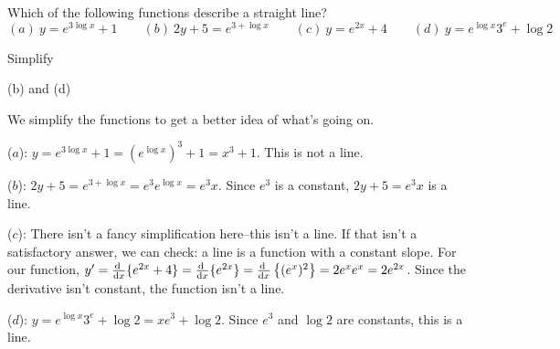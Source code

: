 \begin{Mquestion}
Which of the following functions describe a straight line?
\[(a) ~y=e^{3\log x}+1 \qquad (b) ~2y+5=e^{3+\log x} \qquad (c)~y=e^{2x}+4\qquad (d)~y=e^{\log x}3^e+\log 2\]
\end{Mquestion}
\begin{hint}
Simplify
\end{hint}
\begin{answer}
(b) and (d)
\end{answer}
\begin{solution}
We simplify the functions to get a better idea of what's going on.

($a$): $y=e^{3\log x}+1=\left(e^{\log x}\right)^3+1=x^3+1$. This is not a line.
\smallskip

($b$): $2y+5=e^{3+\log x}=e^3e^{\log x}=e^3x$. Since $e^3$ is a constant, $2y+5=e^3x$ is a line.
\smallskip

($c$): There isn't a fancy simplification here--this isn't a line. If that isn't a satisfactory answer, we can check: a line is a function with a constant slope. For our function,
$y'=\diff{}{x}\{e^{2x} +4\}=\diff{}{x}\{e^{2x}\}=\diff{}{x}\left\{(e^x)^2\right\}=2e^xe^x=2e^{2x}$. Since the derivative isn't constant, the function isn't a line.
\smallskip

($d$): $y=e^{\log x}3^e+\log 2=xe^3+\log 2$. Since $e^3$ and $\log 2$ are constants, this is a line.
\end{solution}



